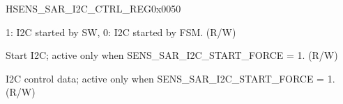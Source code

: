     
    \begin{register}{H}{SENS\_SAR\_I2C\_CTRL\_REG}{0x0050}\label{regdesc:SENSSARI2CCTRLREG}
    \regnewline%
    \begin{regdesc}\begin{reglist}
    \item [SENS\_SAR\_I2C\_START\_FORCE]1: I2C started by SW, 0: I2C started by FSM. (R/W)
    \item [SENS\_SAR\_I2C\_START]Start I2C; active only when SENS\_SAR\_I2C\_START\_FORCE = 1. (R/W)
    \item [SENS\_SAR\_I2C\_CTRL]I2C control data; active only when SENS\_SAR\_I2C\_START\_FORCE  = 1. (R/W)
    \end{reglist}\end{regdesc}
    \end{register}
    
    